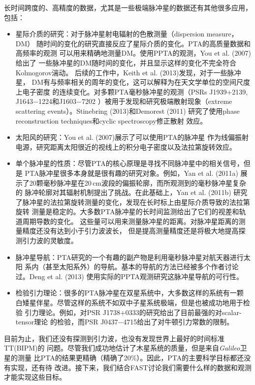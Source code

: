 长时间跨度的、高精度的数据，尤其是一些极端脉冲星的数据还有其他很多应用，
包括：
\begin{itemize}
\item 星际介质的研究：对于脉冲星射电辐射的色散测量（dispersion measure，DM）
随时间的变化的研究直接反应了星际介质的变化。PTA的高质量数据和高频率的观测
可以用来精确地测量DM。使用PPTA的观测，You et al. (2007)\supercite{yhc+07}给出了
一些脉冲星的DM随时间的变化，并且显示这样的变化不完全符合Kolmogorov湍动。
后续的工作中，Keith et al. (2013)\supercite{Keith13}发现，对于一些脉冲星，
DM有与频率相关的周年的变化，这可以解释为在天文学单位的空间尺度上电子密度
的连续变化。对多颗PTA毫秒脉冲星的观测（PSRs J1939$+$2139, J1643$-$1224和J1603$-$7202 
\supercite{cbl+93,mlc03,Keith13}）被用于发现和研究极端散射现象（extreme 
scattering events）。Stinebring (2013)\supercite{sti13}和Demorest (2011)\supercite{dem11}
研究了使用phase reconstruction techniques和cyclic spectroscopy修正散射
效应。
\item 太阳风的研究：You et al. (2007)\supercite{yhc+07}展示了可以使用PTA的脉冲星
作为线偏振射电源，研究距离太阳很近的视线上的积分电子密度以及法拉第旋转效应。
\item 单个脉冲星的性质：尽管PTA的核心原理是寻找不同脉冲星中的相关信号，但是
PTA脉冲星很多本身就是很有趣的研究对象。例如，Yan et al. (2011a)\supercite{Yan11a}
展示了20颗毫秒脉冲星在20\,cm波段的偏振轮廓，而所观测到的毫秒脉冲星复杂的
脉冲轮廓对其辐射机制提出了挑战。在此基础上，Yan et al. (2011b)\supercite{Yan11b}
研究了脉冲星的法拉第旋转测量的变化，发现在长时标上由星际介质导致的法拉第旋转
测量是稳定的。大多数PTA脉冲星的长时间监测给出了它们的视差和轨道周期导数的变化。
这些量可以用来测量脉冲星的距离。对脉冲星距离的测量精度还没有达到小于引力波波长，
但是提高测量精度还是将极大地提高探测引力波的灵敏度。
\item 脉冲星导航：PTA研究的一个有趣的副产物是利用毫秒脉冲星对航天器进行太阳
系内（甚至太阳系外）的导航。基本的导航的方法已经被多个作者讨论过。Deng et al. (2013)
\supercite{dhy+13}使用实际的PPTA观测研究这脉冲星导航的可行性。
\item 检验引力理论：很多的PTA脉冲星在双星系统中，大多数这样的系统有一颗
白矮星伴星。尽管这样的系统不如双中子星系统极端，但是也被成功地用于检验
引力理论。例如，对PSR J1738$+$0333的研究给出了目前最强的对scalar-tensor理论
的检验\supercite{fwe+12}，而PSR J0437$-$4715给出了对牛顿引力常数的限制\supercite{vbv+08}。
\end{itemize}

目前为止，我们还没有探测到引力波，也没有发现世界上最好的时间标准TT(BIPM)的
问题。尽管我们成功地估计了木星系统的质量，但是来自\emph{Galileo}卫星的测量
比PTA的结果更精确（精确了20\%）。因此，PTA的主要科学目标都还没有实现，还有待
改进。接下来，我们结合FAST讨论我们需要什么样的数据和观测才能实现这些目标。

